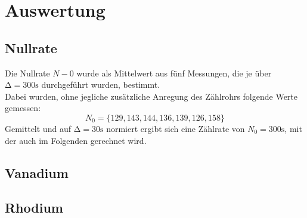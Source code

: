 \section{Auswertung}

\subsection{Nullrate}

Die Nullrate $N-0$ wurde als Mittelwert aus fünf Messungen, die je über $\increment=300\si{\second}$ durchgeführt wurden, bestimmt.\\
Dabei wurden, ohne jegliche zusätzliche Anregung des Zählrohrs folgende Werte gemessen:
\begin{equation*}
    N_0 = \{129, 143, 144, 136, 139, 126, 158 \}
\end{equation*}
Gemittelt und auf $\increment=30\si{\second}$ normiert ergibt sich eine Zählrate von  $N_0= 300\si{\second}$, mit der auch im Folgenden gerechnet wird.\\


\subsection{Vanadium}


\subsection{Rhodium}